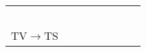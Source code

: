 \begin{longtable}{cXXXXXXX}
                                 &             \citep{DavisVoigt:1996}              &                                                                                                                    &                                                           &                                           &                                                                                             &                                           & \\ 
                                 &          \citep{HancockDavisEtAl:1997}           &                                                                                                                    &                                                           &                                           &                                                                                             &                                           & \\ 
                                 &           \citep{SpirouDavisEtAl:1999}           &                                                                                                                    &                                                           &                                           &                                                                                             &                                           & \\ 
                                 &          \citep{HancockDavisEtAl:2001}           &                                                                                                                    &                                                           &                                           &                                                                                             &                                           & \\ 
                                 &             \citep{YoungDavis:2002}              &                                                                                                                    &                                                           &                                           &                                                                                             &                                           & \\ 
  TV\ensuremath{\rightarrow}TS   &                                                  &                                                                                                                    &                                                           &                                           &                                                                                             &                                           & \\\midrule

\end{longtable}
